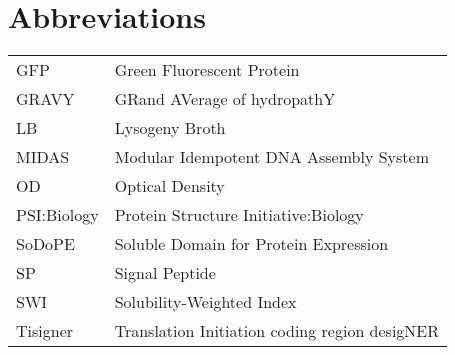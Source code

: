 \section*{Abbreviations}

\begin{table}[!hbtp]
	\begin{tabular}{ll}
		GFP         & Green Fluorescent Protein                     \\
		GRAVY       & GRand AVerage of hydropathY                   \\
		LB          & Lysogeny Broth                                \\
		MIDAS       & Modular Idempotent DNA Assembly System        \\
		OD          & Optical Density                               \\
		PSI:Biology & Protein Structure Initiative:Biology          \\
		SoDoPE      & Soluble Domain for Protein Expression         \\
		SP          & Signal Peptide \\
		SWI         & Solubility-Weighted Index                     \\
		Tisigner    & Translation Initiation coding region desigNER
	\end{tabular}
\end{table}